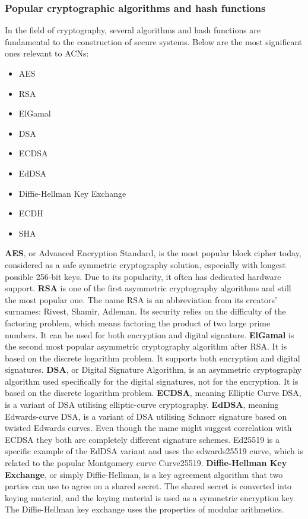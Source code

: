 \subsubsection{Popular cryptographic algorithms and hash functions}
In the field of cryptography, several algorithms and hash functions are fundamental to the construction of secure systems. Below are the most significant ones relevant to ACNs:
\begin{itemize}
\item AES
\item RSA
\item ElGamal
\item DSA
\item ECDSA
\item EdDSA
\item Diffie-Hellman Key Exchange
\item ECDH
\item SHA
\end{itemize}
\textbf{AES}, or Advanced Encryption Standard, is the most popular block cipher today, considered as a safe symmetric cryptography solution, especially with longest possible 256-bit keys. Due to its popularity, it often has dedicated hardware support.
\textbf{RSA} is one of the first asymmetric cryptography algorithms and still the most popular one. The name RSA is an abbreviation from its creators' surnames: Rivest, Shamir, Adleman. Its security relies on the difficulty of the factoring problem, which means factoring the product of two large prime numbers. It can be used for both encryption and digital signature.
\textbf{ElGamal} is the second most popular asymmetric cryptography algorithm after RSA. It is based on the discrete logarithm problem. It supports both encryption and digital signatures.
\textbf{DSA}, or Digital Signature Algorithm, is an asymmetric cryptography algorithm used specifically for the digital signatures, not for the encryption. It is based on the discrete logarithm problem.
\textbf{ECDSA}, meaning Elliptic Curve DSA, is a variant of DSA utilising elliptic-curve cryptography.
\textbf{EdDSA}, meaning Edwards-curve DSA, is a variant of DSA utilising Schnorr signature based on twisted Edwards curves. Even though the name might suggest correlation with ECDSA they both are completely different signature schemes. Ed25519 is a specific example of the EdDSA variant and uses the edwards25519 curve, which is related to the popular Montgomery curve Curve25519. 
\textbf{Diffie-Hellman Key Exchange}, or simply Diffie-Hellman, is a key agreement algorithm that two parties can use to agree on a shared secret. The shared secret is converted into keying material, and the keying material is used as a symmetric encryption key. The Diffie-Hellman key exchange uses the properties of modular arithmetics.
